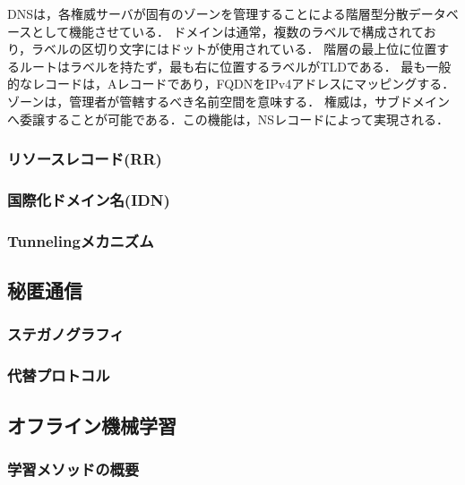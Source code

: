 \documentclass[12pt]{jarticle} %
\begin{document}
DNSは，各権威サーバが固有のゾーンを管理することによる階層型分散データベースとして機能させている．
ドメインは通常，複数のラベルで構成されており，ラベルの区切り文字にはドットが使用されている．
階層の最上位に位置するルートはラベルを持たず，最も右に位置するラベルがTLDである．
最も一般的なレコードは，Aレコードであり，FQDNをIPv4アドレスにマッピングする．
ゾーンは，管理者が管轄するべき名前空間を意味する．
権威は，サブドメインへ委譲することが可能である．この機能は，NSレコードによって実現される．
\subsubsection{リソースレコード(RR)}
\subsubsection{国際化ドメイン名(IDN)}
\subsubsection{Tunnelingメカニズム}
\subsection{秘匿通信}
\subsubsection{ステガノグラフィ}
\subsubsection{代替プロトコル}
\subsection{オフライン機械学習}
\subsubsection{学習メソッドの概要}
\end{document}
